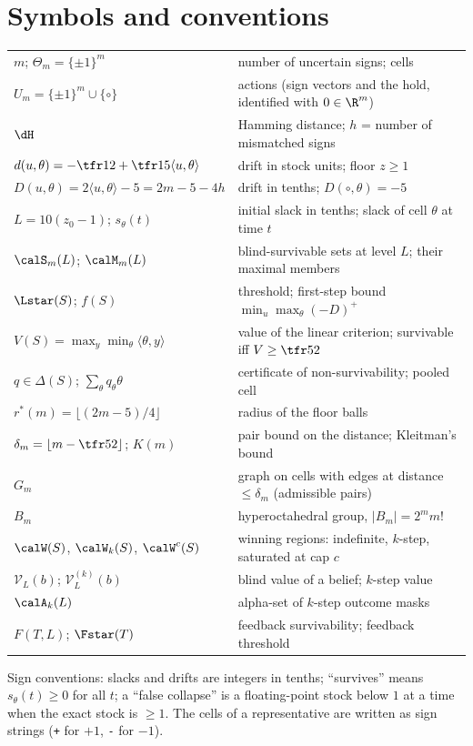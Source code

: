 \section{Symbols and conventions}\label{S:symbols}
\begin{center}\small
\begin{tabular}{ll}
\toprule
$m$; $\Theta_m=\{\pm1\}^m$ & number of uncertain signs; cells\\
$U_m=\{\pm1\}^m\cup\{\circ\}$ & actions (sign vectors and the hold, identified with $0\in\R^m$)\\
$\dH$ & Hamming distance; $h$ = number of mismatched signs\\
$d(u,\theta)=-\tfr12+\tfr15\langle u,\theta\rangle$ & drift in stock units; floor $z\ge1$\\
$D(u,\theta)=2\langle u,\theta\rangle-5=2m-5-4h$ & drift in tenths; $D(\circ,\theta)=-5$\\
$L=10(z_0-1)$; $s_\theta(t)$ & initial slack in tenths; slack of cell $\theta$ at time $t$\\
$\calS_m(L)$; $\calM_m(L)$ & blind-survivable sets at level $L$; their maximal members\\
$\Lstar(S)$; $f(S)$ & threshold; first-step bound $\min_u\max_\theta(-D)^+$\\
$V(S)=\max_y\min_\theta\langle\theta,y\rangle$ & value of the linear criterion; survivable iff $V\ge\tfr52$\\
$q\in\Delta(S)$; $\sum_\theta q_\theta\theta$ & certificate of non-survivability; pooled cell\\
$r^\ast(m)=\lfloor(2m-5)/4\rfloor$ & radius of the floor balls\\
$\delta_m=\lfloor m-\tfr52\rfloor$; $K(m)$ & pair bound on the distance; Kleitman's bound\\
$G_m$ & graph on cells with edges at distance $\le\delta_m$ (admissible pairs)\\
$B_m$ & hyperoctahedral group, $|B_m|=2^mm!$\\
$\calW(S)$, $\calW_k(S)$, $\calW^{c}(S)$ & winning regions: indefinite, $k$-step, saturated at cap $c$\\
$\mathcal V_L(b)$; $\mathcal V^{(k)}_L(b)$ & blind value of a belief; $k$-step value\\
$\calA_k(L)$ & alpha-set of $k$-step outcome masks\\
$F(T,L)$; $\Fstar(T)$ & feedback survivability; feedback threshold\\
\bottomrule
\end{tabular}
\end{center}
Sign conventions: slacks and drifts are integers in tenths; ``survives'' means $s_\theta(t)\ge0$ for all $t$; a ``false collapse'' is a floating-point stock below $1$ at a time when the exact stock is $\ge1$. The cells of a representative are written as sign strings (\texttt{+} for $+1$, \texttt{-} for $-1$).


